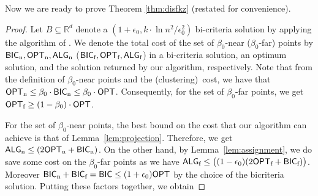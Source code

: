 \documentclass[11pt]{article}
\newcommand{\opt}{\ensuremath{\textsf{OPT}}}
\newcommand{\an}{\textsf{ALG}_{\textnormal{n}}\xspace}
\newcommand{\af}{\textsf{ALG}_{\textnormal{f}}\xspace}
\newcommand{\on}{\textsf{OPT}_{\textnormal{n}}\xspace}
\newcommand{\of}{\textsf{OPT}_{\textnormal{f}}\xspace}
\newcommand{\bicf}{\textsf{BIC}_{\textnormal{f}}\xspace}
\newcommand{\bicn}{\textsf{BIC}_{\textnormal{n}}\xspace}
\newcommand{\bic}{\textsf{BIC}\xspace}
\begin{document}
Now we are ready to prove Theorem \ref{thm:disfkz} (restated  for convenience).
\constapproxsfcz*
\begin{proof}
Let $B\subseteq {\mathbb R}^d$ denote a $(1 + \epsilon_0, k \cdot \ln n^2 / \epsilon_0^2)$ bi-criteria solution by applying the algorithm of \cite{goyal2021tight}. We denote the total cost of the set of $\beta_0$-near ($\beta_0$-far) points by $\bicn, \on, \an$ ($\bicf, \of, \af$) in a bi-criteria solution, an optimum solution, and the solution returned by our algorithm, respectively. Note that from the definition of $\beta_0$-near points and the (clustering)~cost, we have that $\on \leq \beta_0 \cdot \bicn \leq \beta_0 \cdot \opt$. Consequently, for the set of $\beta_0$-far points, we get $\of \geq (1-\beta_0)\cdot \opt$. 

For the set of $\beta_0$-near points, the best bound on the cost that our algorithm can achieve is that of Lemma~\ref{lem:projection}. Therefore, we get $\an \leq(2\on + \bicn)$. On the other hand, by Lemma~\ref{lem:assignment}, we do save some cost on the $\beta_0$-far points as we have $\af \leq \big((1-\epsilon_0)(2\of + \bicf)\big)$.
Moreover $\bicn+ \bicf = \bic \leq (1 + \epsilon_0)\opt$ by the choice of the bicriteria solution. Putting these factors together, we obtain


\end{proof}
\end{document}
